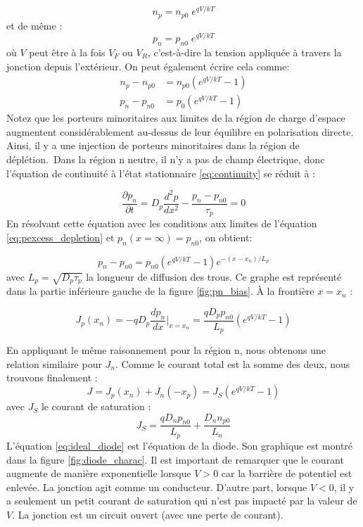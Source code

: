\begin{equation}
	n_p = n_{p0}\;e^{qV/kT}
\end{equation}
et de même :
\begin{equation}
	p_n = p_{n0}\;e^{qV/kT}
	\label{eq:density_junction}
\end{equation}
où $V$ peut être à la fois $V_F$ ou $V_R$, c'est-à-dire la tension appliquée à travers la jonction depuis l'extérieur. On peut également écrire cela comme:
\begin{equation}
	\begin{split}
		n_p - n_{p0} &= n_{p0}(e^{qV/kT} - 1) \\
		p_n - p_{n0} &= p_{0}(e^{qV/kT} - 1)
	\end{split}
\label{eq:pexcess_depletion}
\end{equation}
Notez que les porteurs minoritaires aux limites de la région de charge d'espace augmentent considérablement au-dessus de leur équilibre en polarisation directe. Ainsi, il y a une injection de porteurs minoritaires dans la région de déplétion.\
Dans la région n neutre, il n'y a pas de champ électrique, donc l'équation de continuité à l'état stationnaire \ref{eq:continuity} se réduit à :

\begin{equation}
	\frac{\partial p_n}{\partial t} = D_p \frac{d^2p}{dx^2} - \frac{p_n - p_{n0}}{\tau_p} = 0
\end{equation}
En résolvant cette équation avec les conditions aux limites de l'équation \ref{eq:pexcess_depletion} et $p_n(x = \infty) = p_{n0}$, on obtient:

\begin{equation}
	p_n - p_{n0} = p_{n0} (e^{qV/kT} - 1) e^{-(x-x_n)/L_p}
\end{equation}
avec $L_p = \sqrt{D_p \tau_p}$ la longueur de diffusion des trous. Ce graphe est représenté dans la partie inférieure gauche de la figure \ref{fig:pn_bias}. À la frontière $x=x_n$ :

\begin{equation}
J_p(x_n) = -qD_p \frac{dp_n}{dx}\Bigg|_{x=x_n} = \frac{qD_pp_{n0}}{L_p}(e^{qV/kT} - 1)
\end{equation} 

En appliquant le même raisonnement pour la région n, nous obtenons une relation similaire pour $J_n$. Comme le courant total est la somme des deux, nous trouvons finalement :
\begin{equation}
	J = J_p(x_n) + J_n(-x_p) = J_S(e^{qV/kT} - 1)
	\label{eq:ideal_diode}
\end{equation}
avec $J_S$ le courant de saturation :
\begin{equation}
	J_S = \frac{qD_n p_{n0}}{L_p} + \frac{D_n n_{p0}}{L_n}
\end{equation}
L'équation \ref{eq:ideal_diode} est l'équation de la diode. Son graphique est montré dans la figure \ref{fig:diode_charac}. Il est important de remarquer que le courant augmente de manière exponentielle lorsque $V>0$ car la barrière de potentiel est enlevée. La jonction agit comme un conducteur. D'autre part, lorsque $V<0$, il y a seulement un petit courant de saturation qui n'est pas impacté par la valeur de $V$. La jonction est un circuit ouvert (avec une perte de courant).

